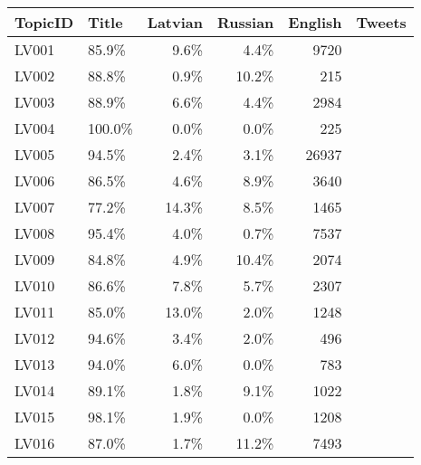 \begin{tabular}{llrrrr}
\toprule
TopicID  & Title &  Latvian & Russian & English &  Tweets \\
\midrule
LV001    &  85.9\% &  9.6\% &  4.4\% &   9720 \\
LV002    &  88.8\% &  0.9\% & 10.2\% &    215 \\
LV003    &  88.9\% &  6.6\% &  4.4\% &   2984 \\
LV004    & 100.0\% &  0.0\% &  0.0\% &    225 \\
LV005    &  94.5\% &  2.4\% &  3.1\% &  26937 \\
LV006    &  86.5\% &  4.6\% &  8.9\% &   3640 \\
LV007    &  77.2\% & 14.3\% &  8.5\% &   1465 \\
LV008    &  95.4\% &  4.0\% &  0.7\% &   7537 \\
LV009    &  84.8\% &  4.9\% & 10.4\% &   2074 \\
LV010    &  86.6\% &  7.8\% &  5.7\% &   2307 \\
LV011    &  85.0\% & 13.0\% &  2.0\% &   1248 \\
LV012    &  94.6\% &  3.4\% &  2.0\% &    496 \\
LV013    &  94.0\% &  6.0\% &  0.0\% &    783 \\
LV014    &  89.1\% &  1.8\% &  9.1\% &   1022 \\
LV015    &  98.1\% &  1.9\% &  0.0\% &   1208 \\
LV016    &  87.0\% &  1.7\% & 11.2\% &   7493 \\
\bottomrule
\end{tabular}
